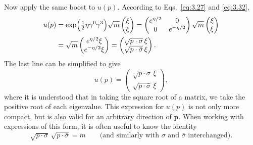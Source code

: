 Now apply the same boost to $u(p)$.  According to Eqs.~\eqref{eq:3.27} and
\eqref{eq:3.32},
\begin{align}
  u(p) &= \exp\Bigl( \tfrac{1}{2}\eta\gamma^0\gamma^3 \Bigr)
    \sqrt{m}\begin{pmatrix}\xi\\ \xi\end{pmatrix}
  = \begin{pmatrix}
      e^{\eta/2} & 0\\
      0 & e^{-\eta/2}
    \end{pmatrix}
    \sqrt{m}\begin{pmatrix}\xi\\ \xi\end{pmatrix}\\
  &= \sqrt{m}
    \begin{pmatrix}
      e^{\eta/2}\xi\\
      e^{-\eta/2}\xi
    \end{pmatrix}
  = \begin{pmatrix}
      \sqrt{p\cdot\sigma}\,\xi\\
      \sqrt{p\cdot\bar{\sigma}}\,\xi
    \end{pmatrix}.
  \label{eq:3.51}
\end{align}
The last line can be simplified to give
\begin{equation}
  u(p) = \begin{pmatrix}
    \sqrt{p\cdot\sigma}\,\xi\\
    \sqrt{p\cdot\bar{\sigma}}\,\xi
  \end{pmatrix},
  \label{eq:3.52}
\end{equation}
where it is understood that in taking the square root of a matrix, we take
the positive root of each eigenvalue.  This expression for $u(p)$ is not only
more compact, but is also valid for an arbitrary direction of $\mathbf{p}$.
When working with expressions of this form, it is often useful to know the
identity
\begin{equation}
  \sqrt{p\cdot\sigma}\,\sqrt{p\cdot\bar{\sigma}} = m
  \qquad\text{(and similarly with $\sigma$ and $\bar{\sigma}$ interchanged)}.
  \label{eq:3.53}
\end{equation}

